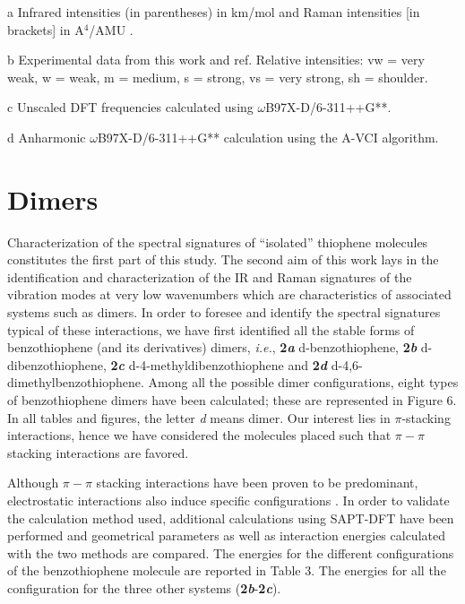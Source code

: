 \begin{table}[H]
\begin{center}
\begin{threeparttable}[b]
				\begin{tablenotes}
					\item[a] Infrared intensities (in parentheses) in km/mol and Raman intensities [in brackets] in A$^{4}$/AMU .
					\item[b] Experimental data from this work and ref\cite{bree1971vibrations}. Relative intensities: vw = very weak, w = weak, m = medium, s = strong, vs = very strong, sh = shoulder.
					\item[c] Unscaled DFT frequencies calculated using $\omega$B97X-D/6-311++G**.
					\item[d] Anharmonic $\omega$B97X-D/6-311++G** calculation using the A-VCI algorithm\cite{garnier2016adaptive}.
				\end{tablenotes}
			\end{threeparttable}
		\end{center}
	\end{table}
	
	
	
	
	
	\section*{Dimers}
	
	Characterization of the spectral signatures of “isolated” thiophene molecules constitutes the first part of this study. The second aim of this work lays in the identification and characterization of the IR and Raman signatures of the vibration modes at very low wavenumbers which are characteristics of associated systems such as dimers. In order to foresee and identify the spectral signatures typical of these interactions, we have first identified all the stable forms of benzothiophene (and its derivatives) dimers, \textit{i.e.}, \textbf{2\textit{a}} d-benzothiophene, \textbf{2\textit{b}} d-dibenzothiophene, \textbf{2\textit{c}} d-4-methyldibenzothiophene and \textbf{2\textit{d}} d-4,6-dimethylbenzothiophene. Among all the possible dimer configurations, eight types of benzothiophene dimers have been calculated; these are represented in Figure 6. In all tables and figures, the letter \textit{d} means dimer.  Our interest lies in $\pi$-stacking interactions, hence we have considered the molecules placed such that $\pi-\pi$ stacking interactions are favored.
	
	Although $\pi-\pi$ stacking interactions have been proven to be predominant, electrostatic interactions also induce specific configurations \cite{liu2014adjusting}. In order to validate the calculation method used, additional calculations using SAPT-DFT have been performed and geometrical parameters as well as interaction energies calculated with the two methods are compared. The energies for the different configurations of the benzothiophene molecule are reported in Table 3. The energies for all the configuration for the three other systems (\textbf{2\textit{b}}-\textbf{2\textit{c}}).
	
